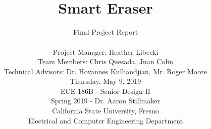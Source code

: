 \begin{filecontents*}{reference.bib}
}
	@misc{socket,
	author			={Nathan Jennings},
	title			={{Socket Programming in Python (Guide)}},
	note			={\url{https://realpython.com/python-sockets/#multi-connection-client}
	}
	
}
\end{filecontents*}

\documentclass[12pt,onecolumn]{IEEEtran}			
\usepackage{dtk-logos}						
\usepackage{graphics}
\usepackage{float}
\usepackage{caption} 
\usepackage[export]{adjustbox}
\usepackage{hyperref}
\usepackage{placeins}
\usepackage{listings}
\usepackage{color}
\usepackage{xcolor}
\usepackage{rotating}


\hypersetup{
	colorlinks=true,
	linkcolor=black,
	filecolor=black,      
	urlcolor=black,
	citecolor=black,
}

\title{ \hfill  \vspace{2in} \\ Smart Eraser \vspace{0.05in} }	

\author{Final Project Report \\ \vspace{0.6in}
\vspace{12pt} 

Project Manager: Heather Libecki\\
\vspace{5pt}
Team Members: Chris Quesada, Juan Colin \\
\vspace{5pt}
Technical Advisors: Dr. Hovannes Kulhandjian, Mr. Roger Moore	\\			
\vspace{12pt} 								
Thursday, May 9, 2019 \\ 
\vspace{3.2in}
ECE 186B - Senior Design II \\ 					
Spring 2019 - Dr. Aaron Stillmaker \\
\vspace{5pt}
California State University, Fresno \\
Electrical and Computer Engineering Department \\ 

\vspace{2in}							


\vspace{4in}}							
										




